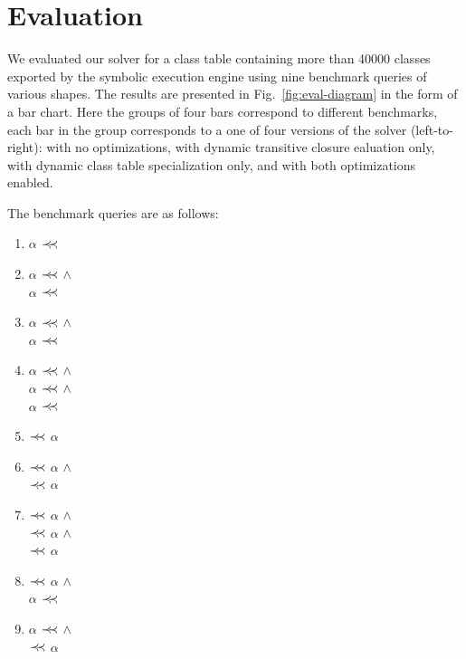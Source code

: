 \section{Evaluation}
\label{sec:eval}

We evaluated our solver for a class table containing more than 40000 classes exported by the symbolic execution engine using
nine benchmark queries of various shapes. The results are presented in Fig.~\ref{fig:eval-diagram} in the form of
a bar chart. Here the groups of four bars correspond to different benchmarks, each bar in the group corresponds to a one of
four versions of the solver (left-to-right): with no optimizations, with dynamic transitive closure ealuation only, with dynamic class table specialization only,
and with both optimizations enabled.

The benchmark queries are as follows:

\begin{enumerate}
   \item $\alpha$ $\prec\mathrel{\mkern-5mu}\prec$ 
   \item $\alpha$ $\prec\mathrel{\mkern-5mu}\prec$  $\land$ \\
          $\alpha$ $\prec\mathrel{\mkern-5mu}\prec$ 
    \item $\alpha$ $\prec\mathrel{\mkern-5mu}\prec$  $\land$ \\
          $\alpha$ $\prec\mathrel{\mkern-5mu}\prec$  
    \item $\alpha$ $\prec\mathrel{\mkern-5mu}\prec$  $\land$ \\
          $\alpha$ $\prec\mathrel{\mkern-5mu}\prec$  $\land$ \\
          $\alpha$ $\prec\mathrel{\mkern-5mu}\prec$ 
    \item {} $\prec\mathrel{\mkern-5mu}\prec$ $\alpha$
    \item {} $\prec\mathrel{\mkern-5mu}\prec$ $\alpha$ $\land$ \\
           $\prec\mathrel{\mkern-5mu}\prec$ $\alpha$
    \item {} $\prec\mathrel{\mkern-5mu}\prec$ $\alpha$ $\land$ \\
           $\prec\mathrel{\mkern-5mu}\prec$ $\alpha$ $\land$ \\
           $\prec\mathrel{\mkern-5mu}\prec$ $\alpha$
    \item {} $\prec\mathrel{\mkern-5mu}\prec$ $\alpha$ $\land$ \\
          $\alpha$ $\prec\mathrel{\mkern-5mu}\prec$ 
    \item $\alpha$ $\prec\mathrel{\mkern-5mu}\prec$  $\land$ \\
           $\prec\mathrel{\mkern-5mu}\prec$ $\alpha$
\end{enumerate}


